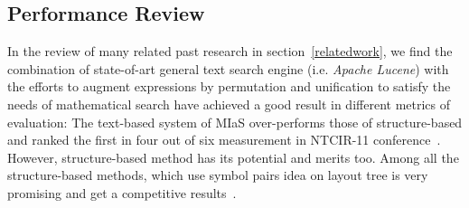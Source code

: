 \subsection{Performance Review}
In the review of many related past research in section~\ref{relatedwork}, we find the combination of state-of-art general text search engine (i.e. \textit{Apache Lucene}) with the efforts to augment expressions by permutation and unification to satisfy the needs of mathematical search have achieved a good result in different metrics of evaluation: 
The text-based system of MIaS over-performs those of structure-based and ranked the first in four out of six measurement in NTCIR-11 conference~\cite{NTCIR11res}. 
However, structure-based method has its potential and merits too. 
Among all the structure-based methods, \cite{symbolpairs15,symbolpair15:2} which use symbol pairs idea on layout tree is very promising and get a competitive results~\cite{NTCIR11res}.
